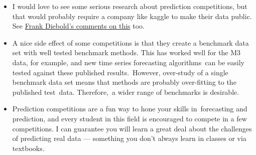 \documentclass[11pt,a4paper,]{article}
\begin{document}
\begin{itemize}
\item
  I would love to see some serious research about prediction competitions, but that would probably require a company like kaggle to make their data public. See \href{http://fxdiebold.blogspot.com.au/2014/04/on-kaggle-forecasting-competitions-part_28.html}{Frank Diebold's comments on this} too.
\item
  A nice side effect of some competitions is that they create a benchmark data set with well tested benchmark methods. This has worked well for the M3 data, for example, and new time series forecasting algorithms~can be easily tested against these published results.~However, over-study of a single benchmark data set means that methods are probably over-fitting to the published test~data. Therefore,~a wider range of benchmarks is desirable.
\item
  Prediction competitions are a fun way to hone your skills in~forecasting and prediction, and every student in this field is encouraged to compete in a few competitions. I can guarantee you will learn a great deal about the challenges of predicting real data --- something you don't always learn in classes or via textbooks.
\end{itemize}

\printbibliography
\end{document}
